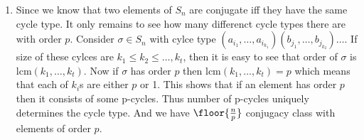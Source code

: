 \begin{enumerate}[label=]
    \item 
        Since we know that two elements of $S_n$ are conjugate iff they have the same cycle type. It only remains to see how many differenct cycle types there are with order $p$.
        Consider $\sigma \in S_n$ with cylce type $(a_{i_1}, \dots, a_{i_{k_1}})(b_{j_1}, \dots, b_{j_{k_2}})\dots$. If size of these cylces are $k_1 \le k_2 \le \dots, k_t$, then it is easy to see that order of $\sigma$ is $\text{lcm}(k_1, \dots, k_t)$. 
        Now if $\sigma$ has order $p$ then $\text{lcm}(k_1, \dots, k_t) = p$ which means that each of $k_i$s are either $p$ or 1. This shows that if an element has order $p$ then it consists of some p-cycles. Thus number of p-cycles uniquely determines the cycle type. And we have $\floor{\frac{n }{p }}$ conjugacy class with elements of order $p$.
\end{enumerate}